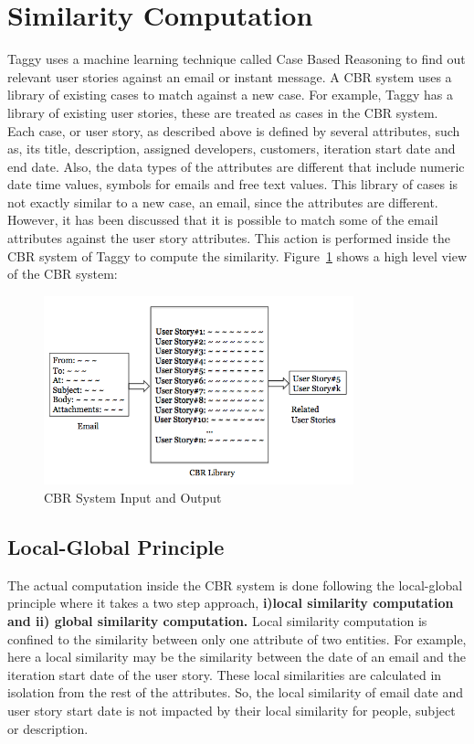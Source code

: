 \section{Similarity Computation}
Taggy uses a machine learning technique called Case Based Reasoning to find out relevant user stories against an email or instant message. A CBR 
system uses a library of existing cases to match against a new case. For example, Taggy has a library of existing user stories, these are treated as cases in the CBR system. Each case, or user story, as described above is defined by several attributes, such as, its title, description, assigned developers, customers, iteration start date and end date. Also, the data types of the attributes are different that include numeric date time values, symbols for emails and free text values. This library of cases is not exactly similar to a new case, an email, since the attributes are different. However, it has been discussed that it is possible to match some of the email attributes against the user story attributes. This action is performed inside the CBR system of Taggy to compute the similarity. Figure~\ref{fig:CBR} shows a high level view of the CBR system:

\begin{figure}[bt]
	\centering
	\includegraphics[width=0.8\textwidth]{CBR.png}
    \caption{CBR System Input and Output}
	\label{fig:CBR}
\end{figure}

\subsection{Local-Global Principle}

The actual computation inside the CBR system is done following the local-global principle\cite{local_global} where it takes a two step approach, \textbf{i)local similarity computation and ii) global similarity computation.} Local similarity computation is confined to the similarity between only one attribute of two entities. For example, here a local similarity may be the similarity between the date of an email and the iteration start date of the user story. These local similarities are calculated in isolation from the rest of the attributes. So, the local similarity of email date and user story start date is not impacted by their local similarity for people, subject or description.


